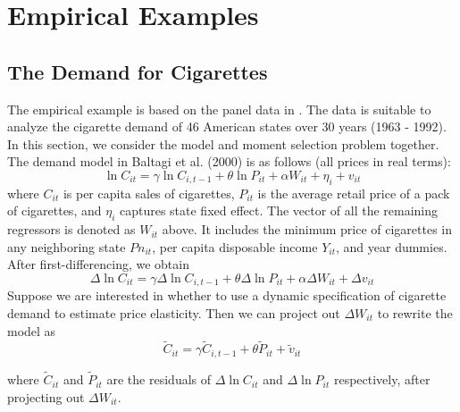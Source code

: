 \section{Empirical Examples}
\label{sec:empirical}

\subsection{The Demand for Cigarettes}
\label{sec:cigarettes}

The empirical example is based on the panel data in \cite{BaltagiEtAl2000}. The data is suitable to analyze the cigarette demand of 46 American states over 30 years (1963 - 1992). In this section, we consider the model and moment selection problem together. The demand model in Baltagi et al. (2000) is as follows (all prices in real terms): 
\[
\ln C_{it} =  \gamma \ln C_{i,t-1} + \theta \ln P_{it} + \alpha W_{it} + \eta_i +  v_{it}
\] 
where $C_{it}$ is per capita sales of cigarettes, $P_{it}$ is the average retail price of a pack of cigarettes, and $\eta_i$ captures state fixed effect. The vector of all the remaining regressors is denoted as $W_{it}$ above. It includes the minimum price of cigarettes in any neighboring state $Pn_{it}$, per capita disposable income $Y_{it}$, and year dummies. After first-differencing, we obtain 
\[
\Delta \ln C_{it} = \gamma \Delta \ln C_{i,t-1} +  \theta \Delta \ln P_{it} +\alpha \Delta W_{it} +  \Delta v_{it}
\]
 Suppose we are interested in whether to use a dynamic specification of cigarette demand to estimate price elasticity. Then we can project out $\Delta W_{it}$ to rewrite the model as
\[
\widetilde{C}_{it} = \gamma \widetilde{C}_{i,t-1} + \theta \widetilde{P}_{it} + \widetilde{v}_{it} 
\] 
 
 where $\widetilde{C}_{it}$ and $\widetilde{P}_{it}$ are the residuals of $\Delta \ln C_{it}$ and $\Delta \ln P_{it}$ respectively, after projecting out $\Delta W_{it}$.
 
